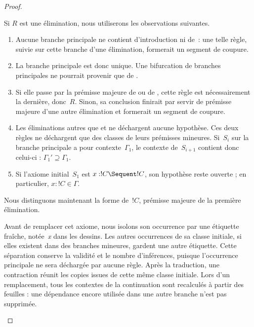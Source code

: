 \documentclass[../../../include/open-logic-section]{subfiles}
\begin{document}
\begin{proof}
\begin{enumerate}
  Si $R$ est une élimination, nous
  utiliserons les observations suivantes.
  \begin{enumerate}
    \item Aucune branche principale
    ne contient d'introduction ni
    de~\FalseInt : une telle règle,
    suivie sur cette branche d'une
    élimination, formerait un segment
    de coupure.
    \item La branche principale est
    donc unique. Une bifurcation de
    branches principales ne pourrait
    provenir que de \Intro{\land}.
    \item Si elle passe par la prémisse
    majeure de \Elim{\lor} ou de
    \Elim{\lexists}, cette règle est
    nécessairement la dernière, donc~$R$.
    Sinon, sa conclusion finirait par
    servir de prémisse majeure d'une
    autre élimination et formerait un
    segment de coupure.
    \item Les éliminations autres que
    \Elim{\lor} et \Elim{\lexists}
    ne déchargent aucune hypothèse.
    Ces deux règles ne déchargent que
    des classes de leurs prémisses
    mineures. Si~$S_i$ sur la branche
    principale a pour contexte~$\Gamma_1$,
    le contexte de~$S_{i+1}$
    contient donc celui-ci :
    $\Gamma_1' \supseteq \Gamma_1$.
    \item Si l'axiome initial~$S_1$
    est $x: !C \Sequent !C$,
    son hypothèse reste ouverte ;
    en particulier, $x:!C \in \Gamma$.
  \end{enumerate}
  Nous distinguons maintenant la forme
  de~$!C$, prémisse majeure de la première
  élimination.

  Avant de remplacer cet axiome, nous
  isolons son occurrence par une étiquette
  fraîche, notée~\emph{x} dans les dessins.
  Les autres occurrences de sa classe
  initiale, si elles existent dans des
  branches mineures, gardent une autre
  étiquette. Cette séparation conserve
  la validité et le nombre d'inférences,
  puisque l'occurrence principale ne
  sera déchargée par aucune règle.
  Après la traduction, une contraction
  réunit les copies issues de cette même
  classe initiale. Lors d'un remplacement,
  tous les contextes de la continuation
  sont recalculés à partir des feuilles :
  une dépendance encore utilisée dans
  une autre branche n'est pas supprimée.


\end{enumerate}
\end{proof}
\end{document}
